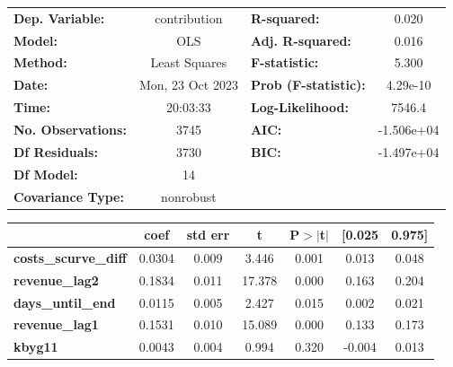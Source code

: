 \begin{center}
\begin{tabular}{lclc}
\toprule
\textbf{Dep. Variable:}                   &   contribution   & \textbf{  R-squared:         } &     0.020   \\
\textbf{Model:}                           &       OLS        & \textbf{  Adj. R-squared:    } &     0.016   \\
\textbf{Method:}                          &  Least Squares   & \textbf{  F-statistic:       } &     5.300   \\
\textbf{Date:}                            & Mon, 23 Oct 2023 & \textbf{  Prob (F-statistic):} &  4.29e-10   \\
\textbf{Time:}                            &     20:03:33     & \textbf{  Log-Likelihood:    } &    7546.4   \\
\textbf{No. Observations:}                &        3745      & \textbf{  AIC:               } & -1.506e+04  \\
\textbf{Df Residuals:}                    &        3730      & \textbf{  BIC:               } & -1.497e+04  \\
\textbf{Df Model:}                        &          14      & \textbf{                     } &             \\
\textbf{Covariance Type:}                 &    nonrobust     & \textbf{                     } &             \\
\bottomrule
\end{tabular}
\begin{tabular}{lcccccc}
                                          & \textbf{coef} & \textbf{std err} & \textbf{t} & \textbf{P$> |$t$|$} & \textbf{[0.025} & \textbf{0.975]}  \\
\midrule
\textbf{costs\_scurve\_diff}              &       0.0304  &        0.009     &     3.446  &         0.001        &        0.013    &        0.048     \\
\textbf{revenue\_lag2}                    &       0.1834  &        0.011     &    17.378  &         0.000        &        0.163    &        0.204     \\
\textbf{days\_until\_end}                 &       0.0115  &        0.005     &     2.427  &         0.015        &        0.002    &        0.021     \\
\textbf{revenue\_lag1}                    &       0.1531  &        0.010     &    15.089  &         0.000        &        0.133    &        0.173     \\
\textbf{kbyg11}                           &       0.0043  &        0.004     &     0.994  &         0.320        &       -0.004    &        0.013     \\

\end{tabular}
\end{center}
